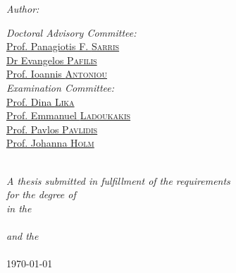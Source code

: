 \documentclass[
11pt, %
english, %
singlespacing, %
liststotoc, %
toctotoc, %
headsepline, %
]{MastersDoctoralThesis} %
\begin{document}
\begin{titlepage}
\begin{center}
\begin{minipage}[t]{0.4\textwidth}
\begin{flushleft} \large
\emph{Author:}\\
\href{http://www.johnsmith.com}{\authorname} %
\end{flushleft}
\end{minipage}
\begin{minipage}[t]{0.5\textwidth}
\begin{flushright} \large
\emph{Doctoral Advisory Committee:} \\
\href{https://www.imbb.forth.gr/imbb-people/en/sarris-members/item/2695-dr-panagiotis-f-sarris}{Prof. Panagiotis F. \textsc{Sarris}}\\ %
\href{http://lab42open.hcmr.gr/people/evangelospafilis/}{Dr Evangelos \textsc{Pafilis}}\\ %
\href{https://users.auth.gr/~iantonio/MEMBERSAntoniou.html}{Prof. Ioannis \textsc{Antoniou}}\\ %
\emph{Examination Committee:} \\
\href{https://dinalika.weebly.com}{Prof. Dina \textsc{Lika}}\\ %
\href{https://www.biology.uoc.gr/index.php/en/personnel/faculty-members?view=article&id=246:ladoukakis-emmanuel&catid=27:dep-en-gb}{Prof. Emmanuel \textsc{Ladoukakis}}\\ %
\href{http://pop-gen.eu/wordpress/people}{Prof. Pavlos \textsc{Pavlidis}}\\ %
\href{https://www.medschool.umaryland.edu/profiles/holm-johanna/}{Prof. Johanna \textsc{Holm}}\\ %
\end{flushright}
\end{minipage}\\[1cm]
 

\large \textit{A thesis submitted in fulfillment of the requirements\\ for the degree of \degreename}\\[0.3cm] %
\textit{in the}\\[0.4cm]
\deptname\\[0.4cm] 

\textit{and the}\\[0.4cm]
\groupname\\[0.5cm] %
 
\vspace{1cm}
{\large \today}\\[4cm] %
 
\end{center}
\end{titlepage}
\end{document}
